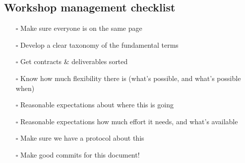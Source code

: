 \documentclass[11pt]{article}
\begin{document}
\subsection{Workshop management checklist}
\label{e28fb669-45a6-4916-b56b-a3afd6238d4f}
\begin{itemize}
\item[{$\square$}] Make sure everyone is on the same page
\item[{$\square$}] Develop a clear taxonomy of the fundamental terms
\item[{$\square$}] Get contracts \& deliverables sorted
\item[{$\square$}] Know how much flexibility there is (what’s possible, and what’s possible when)
\item[{$\square$}] Reasonable expectations about where this is going
\item[{$\square$}] Reasonable expectations how much effort it needs, and what’s available
\item[{$\square$}] Make sure we have a protocol about this
\item[{$\square$}] Make good commits for this document!
\end{itemize}
\end{document}
